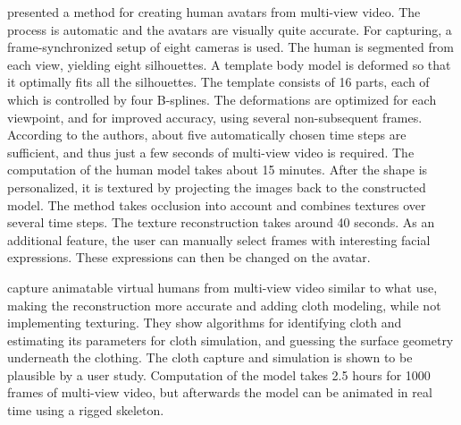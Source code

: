 \newtopic

\citet{ahmed2005automatic} presented a method for creating human avatars from multi-view video. The process is automatic and the avatars are visually quite accurate. For capturing, a frame-synchronized setup of eight cameras is used. The human is segmented from each view, yielding eight silhouettes. A template body model is deformed so that it optimally fits all the silhouettes. The template consists of 16 parts, each of which is controlled by four B-splines. The deformations are optimized for each viewpoint, and for improved accuracy, using several non-subsequent frames. According to the authors, about five automatically chosen time steps are sufficient, and thus just a few seconds of multi-view video is required. The computation of the human model takes about 15 minutes. After the shape is personalized, it is textured by projecting the images back to the constructed model. The method takes occlusion into account and combines textures over several time steps. The texture reconstruction takes around 40 seconds. As an additional feature, the user can manually select frames with interesting facial expressions. These expressions can then be changed on the avatar. \citep{ahmed2005automatic}

\newtopic

\citet{stoll2010video} capture animatable virtual humans from multi-view video similar to what \citet{ahmed2005automatic} use, making the reconstruction more accurate and adding cloth modeling, while not implementing texturing. They show algorithms for identifying cloth and estimating its parameters for cloth simulation, and guessing the surface geometry underneath the clothing. The cloth capture and simulation is shown to be plausible by a user study. Computation of the model takes 2.5 hours for 1000 frames of multi-view video, but afterwards the model can be animated in real time using a rigged skeleton. \citep{stoll2010video}

